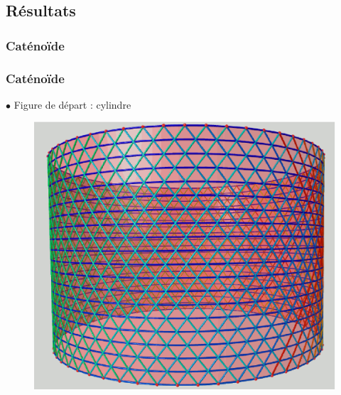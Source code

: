 \documentclass{beamer}
\begin{document}
\subsection{Résultats}
\subsubsection{Caténoïde}

\begin{frame}
\frametitle{Caténoïde}
$\bullet$ Figure de départ : cylindre
\begin{figure}[h!]
      \centering 
      \includegraphics[scale=0.31]{catenoide/catenoide-0.eps}
\end{figure}
\end{frame}
\end{document}
